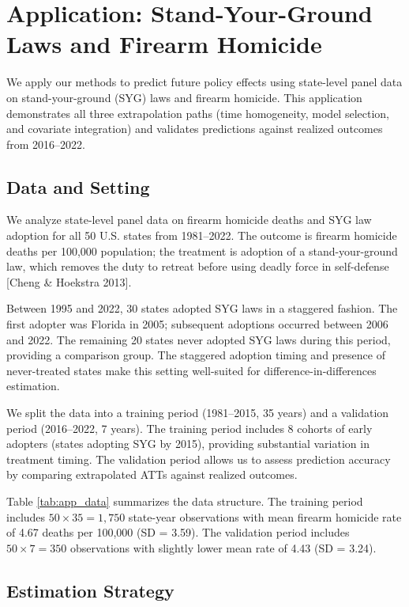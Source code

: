 \section{Application: Stand-Your-Ground Laws and Firearm Homicide}
\label{sec:application}

We apply our methods to predict future policy effects using state-level panel data on stand-your-ground (SYG) laws and firearm homicide. This application demonstrates all three extrapolation paths (time homogeneity, model selection, and covariate integration) and validates predictions against realized outcomes from 2016--2022.

\subsection{Data and Setting}

We analyze state-level panel data on firearm homicide deaths and SYG law adoption for all 50 U.S. states from 1981--2022. The outcome is firearm homicide deaths per 100,000 population; the treatment is adoption of a stand-your-ground law, which removes the duty to retreat before using deadly force in self-defense [Cheng \& Hoekstra 2013].

Between 1995 and 2022, 30 states adopted SYG laws in a staggered fashion. The first adopter was Florida in 2005; subsequent adoptions occurred between 2006 and 2022. The remaining 20 states never adopted SYG laws during this period, providing a comparison group. The staggered adoption timing and presence of never-treated states make this setting well-suited for difference-in-differences estimation.

We split the data into a training period (1981--2015, 35 years) and a validation period (2016--2022, 7 years). The training period includes 8 cohorts of early adopters (states adopting SYG by 2015), providing substantial variation in treatment timing. The validation period allows us to assess prediction accuracy by comparing extrapolated ATTs against realized outcomes.

Table \ref{tab:app_data} summarizes the data structure. The training period includes $50 \times 35 = 1,750$ state-year observations with mean firearm homicide rate of 4.67 deaths per 100,000 (SD = 3.59). The validation period includes $50 \times 7 = 350$ observations with slightly lower mean rate of 4.43 (SD = 3.24).



\subsection{Estimation Strategy}

